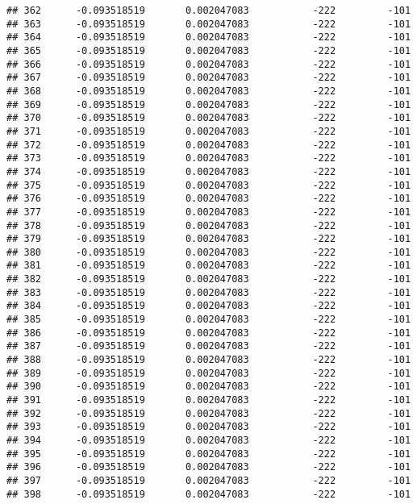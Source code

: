 \documentclass[]{article}
\begin{document}
\begin{verbatim}
## 362      -0.093518519       0.002047083           -222         -101
## 363      -0.093518519       0.002047083           -222         -101
## 364      -0.093518519       0.002047083           -222         -101
## 365      -0.093518519       0.002047083           -222         -101
## 366      -0.093518519       0.002047083           -222         -101
## 367      -0.093518519       0.002047083           -222         -101
## 368      -0.093518519       0.002047083           -222         -101
## 369      -0.093518519       0.002047083           -222         -101
## 370      -0.093518519       0.002047083           -222         -101
## 371      -0.093518519       0.002047083           -222         -101
## 372      -0.093518519       0.002047083           -222         -101
## 373      -0.093518519       0.002047083           -222         -101
## 374      -0.093518519       0.002047083           -222         -101
## 375      -0.093518519       0.002047083           -222         -101
## 376      -0.093518519       0.002047083           -222         -101
## 377      -0.093518519       0.002047083           -222         -101
## 378      -0.093518519       0.002047083           -222         -101
## 379      -0.093518519       0.002047083           -222         -101
## 380      -0.093518519       0.002047083           -222         -101
## 381      -0.093518519       0.002047083           -222         -101
## 382      -0.093518519       0.002047083           -222         -101
## 383      -0.093518519       0.002047083           -222         -101
## 384      -0.093518519       0.002047083           -222         -101
## 385      -0.093518519       0.002047083           -222         -101
## 386      -0.093518519       0.002047083           -222         -101
## 387      -0.093518519       0.002047083           -222         -101
## 388      -0.093518519       0.002047083           -222         -101
## 389      -0.093518519       0.002047083           -222         -101
## 390      -0.093518519       0.002047083           -222         -101
## 391      -0.093518519       0.002047083           -222         -101
## 392      -0.093518519       0.002047083           -222         -101
## 393      -0.093518519       0.002047083           -222         -101
## 394      -0.093518519       0.002047083           -222         -101
## 395      -0.093518519       0.002047083           -222         -101
## 396      -0.093518519       0.002047083           -222         -101
## 397      -0.093518519       0.002047083           -222         -101
## 398      -0.093518519       0.002047083           -222         -101

\end{verbatim}
\end{document}
